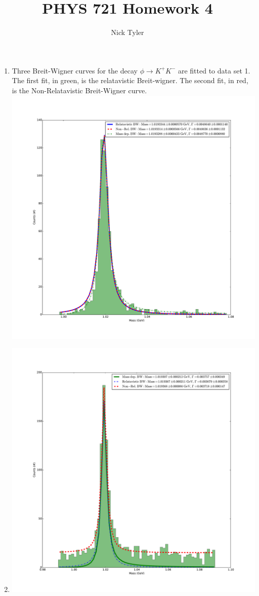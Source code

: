 \documentclass[pdftex]{article}
\title{PHYS 721 Homework 4}
\author{Nick Tyler}
\date{}
\begin{document}
\maketitle
\begin{enumerate}
	\item Three Breit-Wigner curves for the decay $\phi \rightarrow K^{+} K^{- }$ are fitted to data set 1. 
		The first fit, in green, is the relatavistic Breit-wigner. The second fit, in red, is the Non-Relatavistic
		Breit-Wigner curve. \\
		\includegraphics[scale=0.35]{Problem_1.pdf}\\

	\item 
		\includegraphics[scale=0.35]{Problem_3.pdf}\\

\end{enumerate}
\end{document}
